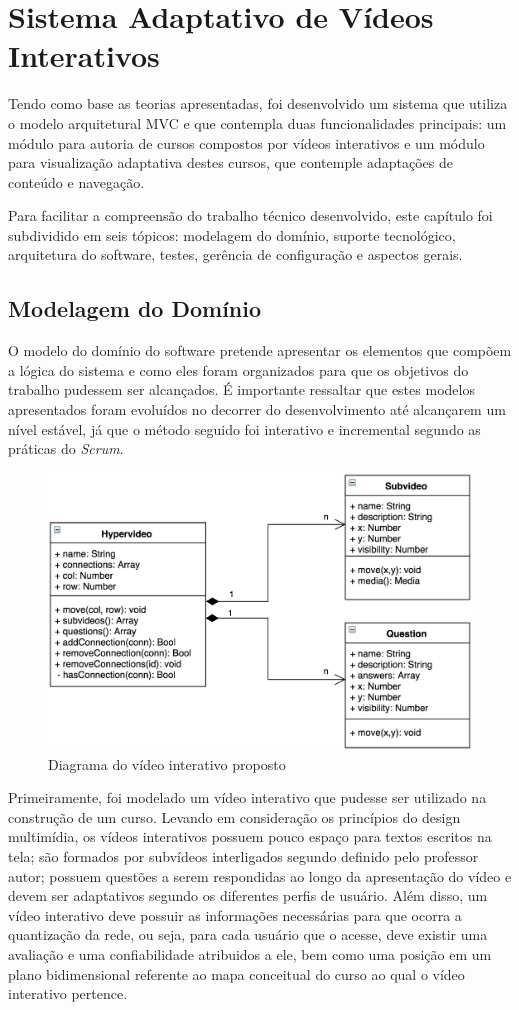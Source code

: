 \chapter[Sistema Adaptativo de Vídeos Interativos]{Sistema Adaptativo de Vídeos Interativos}

Tendo como base as teorias apresentadas, foi desenvolvido um sistema que utiliza o modelo arquitetural MVC e que contempla duas funcionalidades principais: um módulo para autoria de cursos compostos por vídeos interativos e um módulo para visualização adaptativa destes cursos, que contemple adaptações de conteúdo e navegação. 

Para facilitar a compreensão do trabalho técnico desenvolvido, este capítulo foi subdividido em seis tópicos: modelagem do domínio, suporte tecnológico, arquitetura do software, testes, gerência de configuração e aspectos gerais.

\section{Modelagem do Domínio}

O modelo do domínio do software pretende apresentar os elementos que compõem a lógica do sistema e como eles foram organizados para que os objetivos do trabalho pudessem ser alcançados. É importante ressaltar que estes modelos apresentados foram evoluídos no decorrer do desenvolvimento até alcançarem um nível estável, já que o método seguido foi interativo e incremental segundo as práticas do \textit{Scrum}.

\begin{figure}[h!]
	\centering
  	\includegraphics[width=.6\linewidth]{figuras/video.eps}
  	\caption{Diagrama do vídeo interativo proposto}
  	\label{fig:video}
\end{figure}

Primeiramente, foi modelado um vídeo interativo que pudesse ser utilizado na construção de um curso. Levando em consideração os princípios do design multimídia, os vídeos interativos possuem pouco espaço para textos escritos na tela; são formados por subvídeos interligados segundo definido pelo professor autor; possuem questões a serem respondidas ao longo da apresentação do vídeo e devem ser adaptativos segundo os diferentes perfis de usuário. Além disso, um vídeo interativo deve possuir as informações necessárias para que ocorra a quantização da rede, ou seja, para cada usuário que o acesse, deve existir uma avaliação e uma confiabilidade atribuidos a ele, bem como uma posição em um plano bidimensional referente ao mapa conceitual do curso ao qual o vídeo interativo pertence. 

